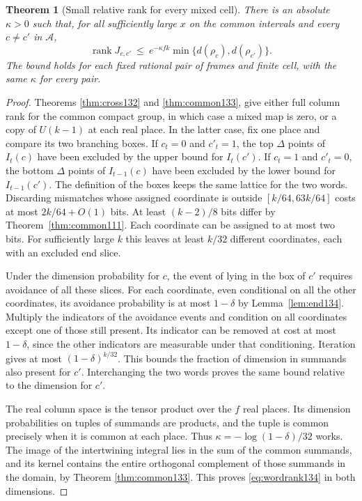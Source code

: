 \documentclass[a4paper,11pt]{article}
\newtheorem{theorem}[proposition]{Theorem}
\theoremstyle{definition}
\theoremstyle{remark}
\numberwithin{equation}{section}
\begin{document}
\begin{theorem}[Small relative rank for every mixed cell]
\label{thm:wordrank134}
There is an absolute \(\kappa>0\) such that, for all sufficiently
large \(x\) on the common intervals and every \(c\ne c'\) in
\(\mathcal A\),
\begin{equation}
       \operatorname{rank} J_{c,c'}
       \ \le\ e^{-\kappa fk}
                \min\{d(\rho_c),d(\rho_{c'})\}.
       \label{eq:wordrank134}
\end{equation}
The bound holds for each fixed rational pair of frames and finite
cell, with the same \(\kappa\) for every pair.
\end{theorem}
\begin{proof}
Theorems \ref{thm:cross132} and \ref{thm:common133}, give either full column rank
for the common compact group, in which case a mixed map is zero,
or a copy of \(U(k-1)\) at each real place. In the latter case,
fix one place and compare its two branching boxes. If \(c_t=0\)
and \(c'_t=1\), the top \(\Delta\) points of \(I_t(c)\) have
been excluded by the upper bound for \(I_t(c')\). If \(c_t=1\)
and \(c'_t=0\), the bottom \(\Delta\) points of \(I_{t-1}(c)\)
have been excluded by the lower bound for \(I_{t-1}(c')\).
The definition of the boxes keeps the same lattice for the two
words. Discarding mismatches whose assigned coordinate is outside
\([k/64,63k/64]\) costs at most \(2k/64+O(1)\) bits. At least
\((k-2)/8\) bits differ by Theorem~\ref{thm:common111}. Each
coordinate can be assigned to at most two bits. For sufficiently
large \(k\) this leaves at least \(k/32\) different coordinates,
each with an excluded end slice.

Under the dimension probability for \(c\), the event of lying in
the box of \(c'\) requires avoidance of all these slices. For
each coordinate, even conditional on all the other coordinates,
its avoidance probability is at most \(1-\delta\) by
Lemma~\ref{lem:end134}. Multiply the indicators of the avoidance
events and condition on all coordinates except one of those
still present. Its indicator can be removed at cost at most
\(1-\delta\), since the other indicators are measurable under
that conditioning. Iteration gives at most
\((1-\delta)^{k/32}\). This bounds the fraction of dimension
in summands also present for \(c'\). Interchanging the two words
proves the same bound relative to the dimension for \(c'\).

The real column space is the tensor product over the \(f\) real
places. Its dimension probabilities on tuples of summands are
products, and the tuple is common precisely when it is common
at each place. Thus \(\kappa=-\log(1-\delta)/32\) works.
The image of the intertwining integral lies in the sum of the
common summands, and its kernel contains the entire orthogonal
complement of those summands in the domain, by Theorem \ref{thm:common133}. This proves \eqref{eq:wordrank134} in both
dimensions.
\end{proof}
\end{document}
